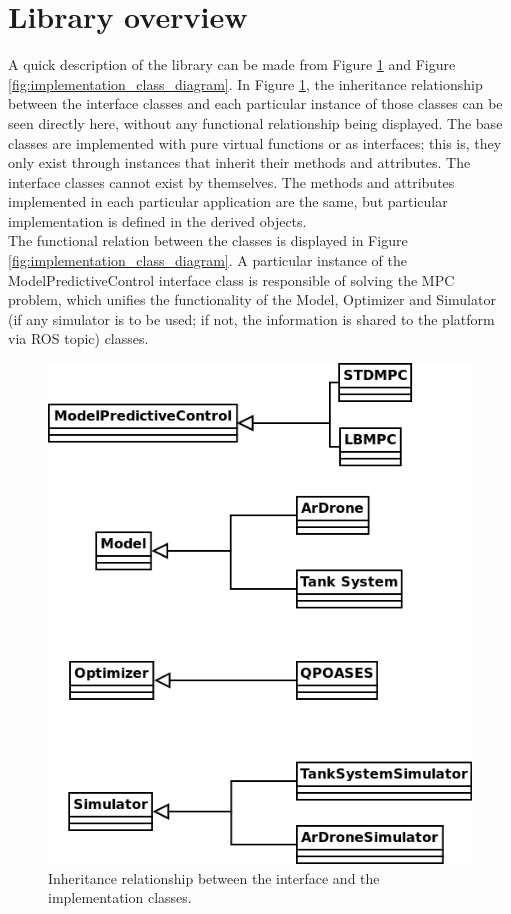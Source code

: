 \section{Library overview}

A quick description of the library can be made from Figure \ref{fig:inheritance_class_diagram} and Figure \ref{fig:implementation_class_diagram}. In Figure \ref{fig:inheritance_class_diagram}, the inheritance relationship between the interface classes and each particular instance of those classes can be seen directly here, without any functional relationship being displayed. The base classes are implemented with pure virtual functions or as interfaces; this is, they only exist through instances that inherit their methods and attributes. The interface classes cannot exist by themselves. The methods and attributes implemented in each particular application are the same, but particular implementation is defined in the derived objects.\\

The functional relation between the classes is displayed in Figure \ref{fig:implementation_class_diagram}. A particular instance of the ModelPredictiveControl interface class is responsible of solving the MPC problem, which unifies the functionality of the Model, Optimizer and Simulator (if any simulator is to be used; if not, the information is shared to the platform via ROS topic) classes.

\begin{figure}[H]
\centering
\includegraphics[scale=0.4]{Images/Chapter4/Class_Diagram.png}
\caption{Inheritance relationship between the interface and the implementation classes.}
\label{fig:inheritance_class_diagram}
\end{figure}


